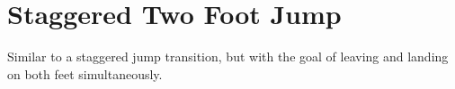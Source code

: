 \section{Staggered Two Foot Jump}
\label{sec:transitions/jump_staggered}

Similar to a staggered jump transition, but with the goal of leaving and landing on both feet simultaneously.  


